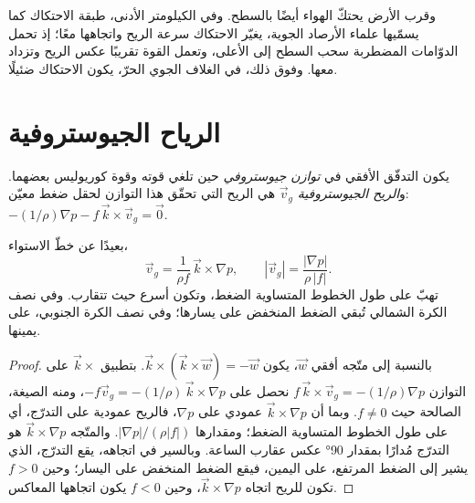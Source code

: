 وقرب الأرض يحتكّ الهواء أيضًا بالسطح. وفي الكيلومتر الأدنى، طبقة الاحتكاك كما يسمّيها علماء الأرصاد الجوية، يغيّر الاحتكاك سرعة الريح واتجاهها معًا؛ إذ تحمل الدوّامات المضطربة سحب السطح إلى الأعلى، وتعمل القوة تقريبًا عكس الريح وتزداد معها. وفوق ذلك، في الغلاف الجوي الحرّ، يكون الاحتكاك ضئيلًا.

\section{الرياح الجيوستروفية}\label{sec:b1:atmospheric-circulation:geostrophic}

\begin{definition}\label{def:b1:atmospheric-circulation:geostrophic}
يكون التدفّق الأفقي في \emph{توازن جيوستروفي} حين تلغي قوته  وقوة كوريوليس بعضهما. و\emph{الريح الجيوستروفية} $\vec v_g$ هي الريح التي تحقّق هذا التوازن لحقل ضغط معيّن: $-(1/\rho)\nabla p - f\,\vec k\times\vec v_g = \vec 0$.
\end{definition}

\begin{theorem}\label{thm:b1:atmospheric-circulation:geostrophic}
بعيدًا عن خطّ الاستواء،
\[
  \vec v_g = \frac{1}{\rho f}\,\vec k\times\nabla p, \qquad
  |\vec v_g| = \frac{|\nabla p|}{\rho\,|f|} .
\]
تهبّ  على طول الخطوط المتساوية الضغط، وتكون أسرع حيث تتقارب. وفي نصف الكرة الشمالي تُبقي الضغط المنخفض على يسارها؛ وفي نصف الكرة الجنوبي، على يمينها.
\end{theorem}

\begin{proof}
بالنسبة إلى متّجه أفقي $\vec w$، يكون $\vec k\times(\vec k\times\vec w) = -\vec w$.
بتطبيق $\vec k\times$ على التوازن $f\,\vec k\times\vec v_g = -(1/\rho)\nabla p$ نحصل على $-f\vec v_g = -(1/\rho)\,\vec k\times\nabla p$، ومنه الصيغة، الصالحة حيث $f \neq 0$. وبما أن $\vec k\times\nabla p$ عمودي على $\nabla p$، فالريح عمودية على التدرّج، أي على طول الخطوط المتساوية الضغط؛ ومقدارها $|\nabla
p|/(\rho|f|)$. والمتّجه $\vec k\times\nabla p$ هو التدرّج مُدارًا بمقدار \ang{90} عكس عقارب الساعة. وبالسير في اتجاهه، يقع التدرّج، الذي يشير إلى الضغط المرتفع، على اليمين، فيقع الضغط المنخفض على اليسار؛ وحين $f > 0$ تكون للريح اتجاه $\vec k\times\nabla p$، وحين $f < 0$ يكون اتجاهها المعاكس.
\end{proof}

